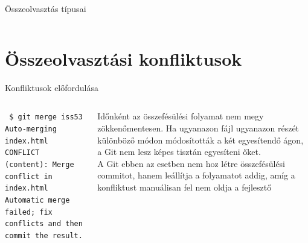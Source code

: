 \documentclass[english, aspectratio=169]{beamer}
\makeatletter
\let\origtableofcontents=\tableofcontents
\def\tableofcontents{\@ifnextchar[{\origtableofcontents}{\gobbletableofcontents}}
\def\gobbletableofcontents#1{\origtableofcontents}
\makeatother
\begin{document}
\begin{frame}{Összeolvasztás típusai}
\begin{columns}
\begin{column}{0.5\textwidth}
\begin{center}
				\end{center}
			\end{column}
		\end{columns}
	\end{frame}
	
	\section{Összeolvasztási konfliktusok}
	
	\begin{frame}
		\tableofcontents[currentsection]
	\end{frame}
	
	\begin{frame}{Konfliktusok előfordulása}
		\begin{columns}
			\begin{column}{.5\textwidth}
				\begin{footnotesize}
					\begin{block}{}
						\texttt{
							\$ git merge iss53\\
							Auto-merging index.html\\
							CONFLICT (content): Merge conflict in index.html\\
							Automatic merge failed; fix conflicts and then commit the result.\\}
					\end{block}
				\end{footnotesize}
			\end{column}
			\begin{column}{.5\textwidth}
				Időnként az összefésülési folyamat nem megy zökkenőmentesen. Ha ugyanazon fájl ugyanazon részét különböző
				módon módosították a két egyesítendő ágon, a Git nem lesz képes tisztán egyesíteni őket.\\
				\vspace{0.2cm}
				A Git ebben az esetben nem hoz létre összefésülési commitot, hanem leállítja a folyamatot addig, amíg a konfliktust
				manuálisan fel nem oldja a fejlesztő
			\end{column}
		\end{columns}
	\end{frame}
	
\end{document}
